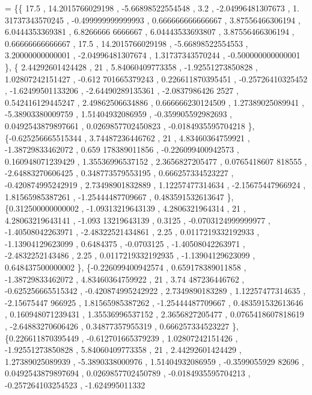 \begin{DoxyCode}
= \{\{             17.5 ,  14.2015766029198 , -5.66898522554548 ,               3.2 , -2.04996481307673 ,  1.
      31737343570245 , -0.499999999999993 , 0.666666666666667 ,  3.87556466306194 ,   6.0444353369381 ,  6.8266666
      6666667 ,  6.04443533693807 ,  3.87556466306194 ,  0.66666666666667 ,              17.5 ,  14.2015766029198 
      , -5.66898522554553 ,  3.20000000000001 , -2.04996481307674 ,  1.31737343570244 , -0.500000000000001 \},
\{ 2.44292601424428 ,                21 ,  5.84060409773358 , -1.92551273850828 ,  1.02807242151427 , -0.612
      701665379243 , 0.226611870395451 , -0.25726410325452 , -1.62499501133206 , -2.64490289135361 , -2.0837986426
      2527 , 0.542416129445247 ,  2.49862506634886 , 0.666666230124509 ,  1.27389025089941 , -5.38903380009759 ,  
      1.51404932086959 , -0.359905592982693 , 0.0492543879897661 , 0.0269857702450823 , -0.0184935595704218 \},
\{-0.625256665515344 ,  3.74487236446762 ,                21 ,  4.83460364759921 , -1.38729833462072 , 0.659
      178389011856 , -0.226099400942573 , 0.160948071239429 ,  1.35536996537152 ,   2.3656827205477 , 0.0765418607
      818555 , -2.64883270606425 , 0.348773579553195 , 0.666257334523227 , -0.420874995242919 ,  2.73498901832889 
      ,  1.12257477314634 , -2.15675447966924 ,  1.81565985387261 , -1.25444487709667 , 0.483591532613647 \},
\{0.312500000000002 , -1.09313219643139 ,   4.2806321964314 ,                21 ,  4.28063219643141 , -1.093
      13219643139 ,            0.3125 , -0.0703124999999977 , -1.40508042263971 , -2.48322521434861 ,             
       2.25 , 0.0117219332192933 , -1.13904129623099 ,         0.6484375 ,        -0.0703125 , -1.40508042263971 ,
        -2.4832252143486 ,              2.25 , 0.0117219332192935 , -1.13904129623099 , 0.648437500000002 \},
\{-0.226099400942574 , 0.659178389011858 , -1.38729833462072 ,  4.83460364759922 ,                21 ,  3.74
      487236446762 , -0.625256665515342 , -0.420874995242922 ,   2.7349890183289 ,  1.12257477314635 , -2.15675447
      966925 ,  1.81565985387262 , -1.25444487709667 , 0.483591532613646 , 0.160948071239431 ,  1.35536996537152 ,
         2.3656827205477 , 0.0765418607818619 , -2.64883270606426 ,  0.34877357955319 , 0.666257334523227 \},
\{0.226611870395449 , -0.612701665379239 ,  1.02807242151426 , -1.92551273850828 ,  5.84060409773358 ,      
                21 ,  2.44292601424429 ,  1.27389025089939 ,  -5.3890338000976 ,  1.51404932086959 , -0.3599055929
      82696 , 0.0492543879897694 , 0.0269857702450789 , -0.0184935595704213 , -0.257264103254523 , -1.624995011332

\end{DoxyCode}
